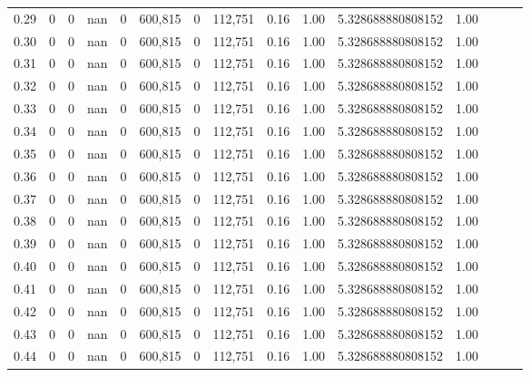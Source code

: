 \begin{tabular}{rrrrrrrrrrrrrrr}
0.29 &        0 &        0 &   nan &        0 &  600,815 &        0 &  112,751 &  0.16 &  1.00 &    5.328688880808152 &      1.00 \\
0.30 &        0 &        0 &   nan &        0 &  600,815 &        0 &  112,751 &  0.16 &  1.00 &    5.328688880808152 &      1.00 \\
0.31 &        0 &        0 &   nan &        0 &  600,815 &        0 &  112,751 &  0.16 &  1.00 &    5.328688880808152 &      1.00 \\
0.32 &        0 &        0 &   nan &        0 &  600,815 &        0 &  112,751 &  0.16 &  1.00 &    5.328688880808152 &      1.00 \\
0.33 &        0 &        0 &   nan &        0 &  600,815 &        0 &  112,751 &  0.16 &  1.00 &    5.328688880808152 &      1.00 \\
0.34 &        0 &        0 &   nan &        0 &  600,815 &        0 &  112,751 &  0.16 &  1.00 &    5.328688880808152 &      1.00 \\
0.35 &        0 &        0 &   nan &        0 &  600,815 &        0 &  112,751 &  0.16 &  1.00 &    5.328688880808152 &      1.00 \\
0.36 &        0 &        0 &   nan &        0 &  600,815 &        0 &  112,751 &  0.16 &  1.00 &    5.328688880808152 &      1.00 \\
0.37 &        0 &        0 &   nan &        0 &  600,815 &        0 &  112,751 &  0.16 &  1.00 &    5.328688880808152 &      1.00 \\
0.38 &        0 &        0 &   nan &        0 &  600,815 &        0 &  112,751 &  0.16 &  1.00 &    5.328688880808152 &      1.00 \\
0.39 &        0 &        0 &   nan &        0 &  600,815 &        0 &  112,751 &  0.16 &  1.00 &    5.328688880808152 &      1.00 \\
0.40 &        0 &        0 &   nan &        0 &  600,815 &        0 &  112,751 &  0.16 &  1.00 &    5.328688880808152 &      1.00 \\
0.41 &        0 &        0 &   nan &        0 &  600,815 &        0 &  112,751 &  0.16 &  1.00 &    5.328688880808152 &      1.00 \\
0.42 &        0 &        0 &   nan &        0 &  600,815 &        0 &  112,751 &  0.16 &  1.00 &    5.328688880808152 &      1.00 \\
0.43 &        0 &        0 &   nan &        0 &  600,815 &        0 &  112,751 &  0.16 &  1.00 &    5.328688880808152 &      1.00 \\
0.44 &        0 &        0 &   nan &        0 &  600,815 &        0 &  112,751 &  0.16 &  1.00 &    5.328688880808152 &      1.00 \\

\end{tabular}
